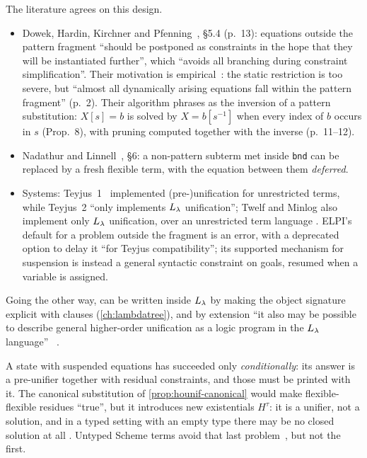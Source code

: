 The literature agrees on this design.
\begin{itemize}\emergencystretch=2em
  \item Dowek, Hardin, Kirchner and Pfenning~\cite{DowekHardinKirchnerPfenning1996}, \S5.4 (p.~13): equations outside
    the pattern fragment \enquote{should be postponed as constraints in the hope that they will be instantiated
    further}, which \enquote{avoids all branching during constraint simplification}. Their motivation is
    empirical~\cite{MichaylovPfenning1992}: the static restriction is too severe, but \enquote{almost all dynamically
    arising equations fall within the pattern fragment} (p.~2). Their algorithm phrases  as the
    inversion of a pattern substitution: $X[s]=b$ is solved by $X=b[s^{-1}]$ when every index of $b$ occurs in $s$
    (Prop.~8), with pruning computed together with the inverse (p.~11--12).
  \item Nadathur and Linnell~\cite{NadathurLinnell2005}, \S6: a non-pattern subterm met inside \texttt{bnd} can be
    replaced by a fresh flexible term, with the equation between them \emph{deferred}.
  \item Systems: Teyjus~1~\cite{NadathurMitchell1999} implemented (pre-)unification for unrestricted terms, while
    Teyjus~2 \enquote{only implements $L_\lambda$ unification}; Twelf and Minlog also implement only $L_\lambda$ unification,
    over an unrestricted term language . ELPI's default for a problem outside the fragment is an error,
    with a deprecated option to delay it \enquote{for Teyjus compatibility}; its supported mechanism for suspension
    is instead a general syntactic constraint on goals, resumed when a variable is assigned.
\end{itemize}
Going the other way,  can be written inside $L_\lambda$ by making the object signature explicit with
 clauses (\cref{ch:lambdatree}), and by extension \enquote{it also may be possible to describe general
higher-order unification as a logic program in the $L_\lambda$ language} ~\cite{Miller1991}.

\begin{pitfall}
A state with suspended equations has succeeded only \emph{conditionally}: its answer is a pre-unifier together
with residual constraints, and those must be printed with it. The canonical substitution of
\cref{prop:hounif-canonical} would make flexible-flexible residues \enquote{true}, but it introduces new existentials
$H^\tau$: it is a unifier, not a solution, and in a typed setting with an empty type there may be no closed solution
at all . Untyped Scheme terms avoid that last problem~\cite[\S9.3]{Miller1991}, but not the first.
\end{pitfall}

